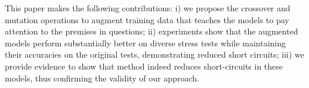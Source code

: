 

This paper makes the following contributions:
i) we propose the crossover and mutation operations
to augment training data that teaches the models to pay attention to
the premises in questions; ii) experiments show that the augmented models 
perform substantially better on diverse stress tests while maintaining their
accuracies on the original tests, demonstrating reduced short circuits;
iii) we provide evidence to show that method indeed reduces 
short-circuits in these models, thus confirming the 
validity of our approach.







